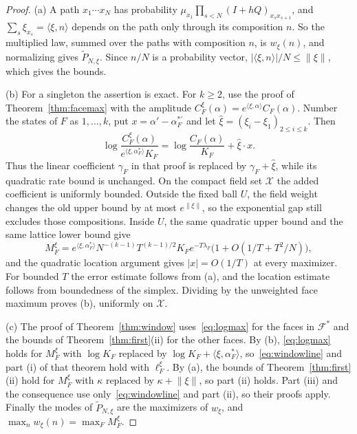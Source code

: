 \begin{proof}
(a) A path $x_1\cdots x_N$ has probability $\mu_{x_1}\prod_{s<N}(I+hQ)_{x_sx_{s+1}}$, and
$\sum_s\xi_{x_s}=\langle\xi,n\rangle$ depends on the path only through its composition
$n$. So the multiplied law, summed over the paths with composition $n$, is $w_\xi(n)$, and
normalizing gives $\widetilde P_{N,\xi}$. Since $n/N$ is a probability vector,
$|\langle\xi,n\rangle|/N\le\lVert\xi\rVert$, which gives the bounds.

(b) For a singleton the assertion is exact. For $k\ge2$, use the proof of
Theorem~\ref{thm:facemax} with the amplitude
$C_F^\xi(\alpha)=e^{\langle\xi,\alpha\rangle}C_F(\alpha)$. Number the states of $F$ as
$1,\dots,k$, put $x=\alpha'-\alpha_F^{*\prime}$ and let
$\hat\xi=(\xi_i-\xi_1)_{2\le i\le k}$. Then
\[
\log\frac{C_F^\xi(\alpha)}{e^{\langle\xi,\alpha_F^*\rangle}K_F}
=\log\frac{C_F(\alpha)}{K_F}+\hat\xi\cdot x .
\]
Thus the linear coefficient $\gamma_F$ in that proof is replaced by
$\gamma_F+\hat\xi$, while its quadratic rate bound is unchanged. On the compact field
set $\mathcal X$ the added coefficient is uniformly bounded. Outside the fixed ball $U$,
the field weight changes the old upper bound by at most $e^{\lVert\xi\rVert}$, so the
exponential gap still excludes those compositions. Inside $U$, the same quadratic upper
bound and the same lattice lower bound give
\[
M_F^\xi=e^{\langle\xi,\alpha_F^*\rangle}
N^{-(k-1)}T^{(k-1)/2}K_Fe^{-T\lambda_F}
\bigl(1+O(1/T+T^2/N)\bigr),
\]
and the quadratic location argument gives $|x|=O(1/T)$ at every maximizer.
For bounded $T$ the error estimate follows from (a), and the location estimate follows
from boundedness of the simplex. Dividing by the unweighted face maximum proves (b),
uniformly on $\mathcal X$.

(c) The proof of Theorem~\ref{thm:window} uses~\eqref{eq:logmax} for the faces in
$\mathcal F^*$ and the bounds of Theorem~\ref{thm:first}(ii) for the other faces. By (b),
\eqref{eq:logmax} holds for $M^\xi_F$ with $\log K_F$ replaced by
$\log K_F+\langle\xi,\alpha^*_F\rangle$, so~\eqref{eq:windowline} and part (i) of that theorem
hold with $\ell^\xi_F$. By (a), the bounds of Theorem~\ref{thm:first}(ii) hold for $M^\xi_F$
with $\kappa$ replaced by $\kappa+\lVert\xi\rVert$, so part (ii) holds. Part (iii) and the
consequence use only~\eqref{eq:windowline} and part (ii), so their proofs apply. Finally the
modes of $\widetilde P_{N,\xi}$ are the maximizers of $w_\xi$, and
$\max_nw_\xi(n)=\max_FM^\xi_F$.


\end{proof}
